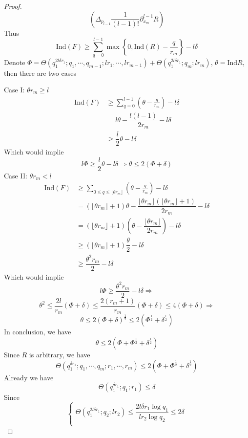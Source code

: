 \begin{proof}
$$\left(\Delta_{p_{l-1}}\frac{1}{(l-1)!}\partial_{x_{m}}^{l-1}R\right) $$
Thus 
$$ \mathrm{Ind}(F) \geq \sum_{q=0}^{l-1}\max\left\{0, \mathrm{Ind}(R) - \frac{q}{r_{m}}\right\} - l\delta $$
Denote $ \Phi = \Theta(q_{1}^{2l\delta r_{1}};q_{1},\cdots,q_{m-1};lr_{1},\cdots,lr_{m-1}) + 
\Theta(q_{1}^{2l\delta r_{1}};q_{m};lr_{m}) $, $ \theta = \mathrm{Ind} R $, then there are two cases \par
Case I: $ \theta r_{m} \geq l $
$$
\begin{aligned}
\mathrm{Ind}(F) 
&\geq \sum_{q=0}^{l-1}\left( \theta-\frac{q}{r_{m}} \right) - l\delta \\
&= l\theta-\dfrac{l(l-1)}{2r_{m}}-l\delta \\
&\geq \dfrac{l}{2}\theta - l\delta
\end{aligned}
$$
Which would implie
$$ l\Phi \geq \dfrac{l}{2}\theta - l\delta \Rightarrow \theta \leq 2(\Phi+\delta) $$
Case II: $ \theta r_{m} < l $
$$
\begin{aligned}
\mathrm{Ind}(F) 
&\geq \sum_{0 \leq q \leq \lfloor \theta r_{m} \rfloor}\left( \theta-\frac{q}{r_{m}} \right) - l\delta \\
&= \left(\lfloor\theta r_{m}\rfloor+1\right)\theta - \dfrac{\lfloor\theta r_{m}\rfloor\left(\lfloor\theta r_{m}\rfloor+1\right)}{2r_{m}} - l\delta \\
&= \left(\lfloor\theta r_{m}\rfloor+1\right)\left( \theta-\dfrac{\lfloor\theta r_{m}\rfloor}{2r_{m}} \right) - l\delta \\
&\geq \left(\lfloor\theta r_{m}\rfloor+1\right)\dfrac{\theta}{2} - l\delta \\
&\geq \dfrac{\theta^{2}r_{m}}{2} - l\delta
\end{aligned}
$$
Which would implie
$$ l\Phi \geq \dfrac{\theta^{2}r_{m}}{2} - l\delta \Rightarrow $$
$$ \theta^{2} \leq \dfrac{2l}{r_{m}}(\Phi+\delta) \leq \dfrac{2(r_{m}+1)}{r_{m}}(\Phi+\delta) \leq 4(\Phi+\delta) \Rightarrow $$
$$ \theta \leq 2(\Phi+\delta)^{\frac{1}{2}} \leq 2(\Phi^{\frac{1}{2}}+\delta^{\frac{1}{2}}) $$
In conclusion, we have 
$$ \theta \leq 2(\Phi+\Phi^{\frac{1}{2}}+\delta^{\frac{1}{2}}) $$
Since $ R $ is arbitrary, we have
$$ \Theta(q_{1}^{\delta r_{1}};q_{1},\cdots,q_{m};r_{1},\cdots,r_{m}) 
\leq 2(\Phi+\Phi^{\frac{1}{2}}+\delta^{\frac{1}{2}}) $$
Already we have
$$ \Theta(q_{1}^{\delta r_{1}};q_{1};r_{1}) \leq \delta $$
Since
$$ 
\left\{
\begin{aligned}
\Theta(q_{1}^{2l\delta r_{1}};q_{2};lr_{2}) \leq \dfrac{2l\delta r_{1}\log q_{1}}{lr_{2}\log q_{2}} \leq 2\delta \\

\end{aligned}$$
\end{proof}
